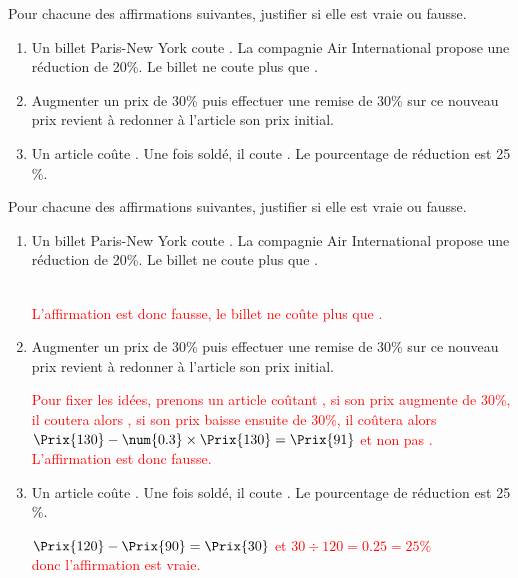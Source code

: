 \begin{exercice*}
    Pour chacune des affirmations suivantes, justifier si elle est vraie ou fausse.
    \begin{enumerate}
        \item Un billet Paris-New York coute . La compagnie Air International propose une réduction de 20\%.
        Le billet ne coute plus que .
        \item Augmenter un prix de 30\% puis effectuer une remise de 30\% sur ce nouveau prix revient à redonner à l’article son prix initial.
        \item Un article coûte . Une fois soldé, il coute . Le pourcentage de réduction est 25 \%.
    \end{enumerate}
\end{exercice*}
\begin{corrige}
    Pour chacune des affirmations suivantes, justifier si elle est vraie ou fausse.\par
    \begin{enumerate}
        \item Un billet Paris-New York coute . La compagnie Air International propose une réduction de 20\%. Le billet ne coute plus que .
        \par\textcolor{red}{%
            \\\smallskip
            L'affirmation est donc fausse, le billet ne coûte plus que .
        }
        \item Augmenter un prix de 30\% puis effectuer une remise de 30\% sur ce nouveau prix revient à redonner à l’article son prix initial.
        \par\textcolor{red}{%
            Pour fixer les idées, prenons un article coûtant , si son prix augmente de 30\%, il coutera alors , si son prix
            baisse ensuite de 30\%, il coûtera alors $\Prix{130}-\num{0.3}\times\Prix{130}=\Prix{91}$ et non pas .\\\smallskip
            L'affirmation est donc fausse.
        }
        \item Un article coûte . Une fois soldé, il coute . Le pourcentage de réduction est 25 \%.
        \par\textcolor{red}{%
        $\Prix{120}-\Prix{90}=\Prix{30}$ et $30\div 120 = \num{0.25} = 25\%$ \\ donc l'affirmation est vraie.
        }
    \end{enumerate}
\end{corrige}

